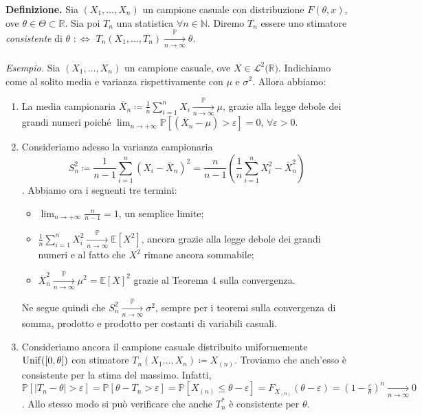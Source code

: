 \textbf{Definizione.} Sia $(X_1,\ldots,X_n)$ un campione casuale con distribuzione $F(\theta,x)$, ove $\theta\in \Theta\subset \mathbb{R}$. Sia poi $T_n$ una statistica $\forall n\in \mathbb{N}$. Diremo $T_n$ essere uno stimatore \textit{consistente} di $\theta$ $:\Longleftrightarrow$ $T_n(X_1,\ldots,T_n)\xrightarrow[n\rightarrow \infty]{\mathbb{P}} \theta$. \\ \\
\textit{Esempio.} Sia $(X_1,\ldots,X_n)$ un campione casuale, ove $X\in \mathcal{L}^2(\mathbb{R)}$. Indichiamo come al solito media e varianza rispettivamente con $\mu$ e $\sigma^2$. Allora abbiamo:
\begin{enumerate}
\item La media campionaria $\overline{X}_n\coloneqq \frac{1}{n}\sum_{i=1}^n X_i\xrightarrow[n\rightarrow \infty]{\mathbb{P}} \mu$, grazie alla legge debole dei grandi numeri poiché $\lim_{n\rightarrow +\infty} \mathbb{P}[(\overline{X}_n-\mu)>\varepsilon ]=0$, $\forall \varepsilon >0$.
\item Consideriamo adesso la varianza campionaria $$S_n^2\coloneqq \frac{1}{n-1}\sum_{i=1}^n (X_i-\overline{X}_n)^2=\frac{n}{n-1}\left(\frac{1}{n}\sum_{i=1}^n X_i^2-\overline{X}_n^2\right)$$. Abbiamo ora i seguenti tre termini:
\begin{itemize}
\item $\lim_{n\rightarrow +\infty} \frac{n}{n-1}=1$, un semplice limite;
\item $\frac{1}{n}\sum_{i=1}^n X_i^2 \xrightarrow[n\rightarrow \infty]{\mathbb{P}} \mathbb{E}[X^2]$, ancora grazie alla legge debole dei grandi numeri e al fatto che $X^2$ rimane ancora sommabile;
\item $\overline{X}_n^2 \xrightarrow[n\rightarrow \infty]{\mathbb{P}} \mu^2=\mathbb{E}[X]^2$ grazie al Teorema 4 sulla convergenza.
\end{itemize}
Ne segue quindi che $S_n^2 \xrightarrow[n\rightarrow \infty]{\mathbb{P}} \sigma^2$, sempre per i teoremi sulla convergenza di somma, prodotto e prodotto per costanti di variabili casuali.
\item Consideriamo ancora il campione casuale distribuito uniformemente $\operatorname{Unif}([0,\theta])$ con stimatore $T_n(X_1\ldots,X_n)\coloneqq X_{(n)}$. Troviamo che anch'esso è consistente per la stima del massimo. Infatti, $\mathbb{P}[|T_n-\theta|>\varepsilon]=\mathbb{P}[\theta-T_n>\varepsilon]=\mathbb{P}[X_{(n)}\leq \theta-\varepsilon]=F_{X_{(n)}}(\theta -\varepsilon)=\left(1-\frac{\varepsilon}{\theta}\right)^n \xrightarrow[n\rightarrow \infty]{} 0$. Allo stesso modo si può verificare che anche $T_n^*$ è consistente per $\theta$.
\end{enumerate}
